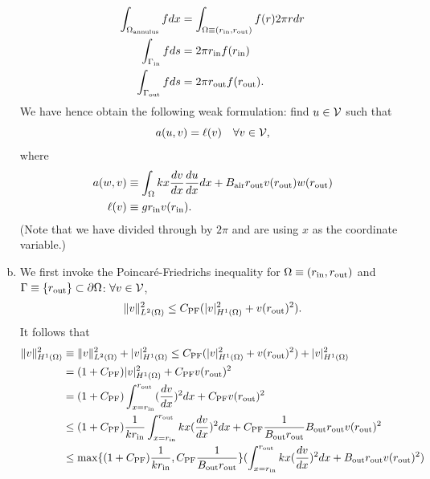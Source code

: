\documentclass[preprint,11pt]{article}
\begin{document}
\begin{enumerate}[(a)]
  \begin{align*}
    \int_{\Omega_{\rm annulus}} f dx
    &= \int_{\Omega \equiv (r_{\rm in},r_{\rm out})} f(r) 2\pi r dr \\
    \int_{\Gamma_{\rm in}} f ds
    &= 2\pi r_{\rm in} f(r_{\rm in}) \\
    \int_{\Gamma_{\rm out}} f ds
    &= 2\pi r_{\rm out} f(r_{\rm out}).
  \end{align*}
  We have hence obtain the following weak formulation: find $u \in \mathcal{V}$ such that
  \begin{equation*}
    a(u,v) = \ell(v) \quad \forall v \in \mathcal{V},
  \end{equation*}
  where
  \begin{align*}
    a(w,v) &\equiv \int_{\Omega} k x \frac{d v}{d x} \frac{d u}{d x} dx + B_{\rm air} r_{\rm out} v(r_{\rm out})w(r_{\rm out}) \\
    \ell(v) &\equiv  g r_{\rm in} v(r_{\rm in})   .
  \end{align*}
  (Note that we have divided through by $2\pi$ and are using $x$ as the coordinate variable.)
\item We first invoke the Poincar\'e-Friedrichs inequality for $\Omega \equiv (r_{\rm in}, r_{\rm out})$ and $\Gamma \equiv \{ r_{\rm out} \} \subset \partial \Omega$: $\forall v \in \mathcal{V}$,
  \begin{align*}
    \| v \|_{L^2(\Omega)}^2 \leq C_{\rm PF} (|v|^2_{H^1(\Omega)} + v(r_{\rm out})^2). 
  \end{align*}
  It follows that
  \begin{align*}
    \| v \|_{H^1(\Omega)}^2
    &\equiv
    \| v \|_{L^2(\Omega)}^2  + | v |_{H^1(\Omega)}^2
    \leq
    C_{\rm PF} (|v|^2_{H^1(\Omega)} + v(r_{\rm out})^2) + | v |_{H^1(\Omega)}^2
    \\
    &= (1 + C_{\rm PF}) | v |^2_{H^1(\Omega)} +  C_{\rm PF} v(r_{\rm out})^2
    \\
    &= (1 + C_{\rm PF}) \int_{x = r_{\rm in}}^{r_{\rm out}} (\dd{v}{x})^2 dx +  C_{\rm PF} v(r_{\rm out})^2
    \\
    &\leq
    (1 + C_{\rm PF}) \frac{1}{k r_{\rm in}} \int_{x = r_{\rm in}}^{r_{\rm out}} kx (\dd{v}{x})^2 dx +  C_{\rm PF} \frac{1}{B_{\rm out} r_{\rm out}}B_{\rm out} r_{\rm out} v(r_{\rm out})^2
    \\
    &\leq
    \max\{   (1 + C_{\rm PF}) \frac{1}{k r_{\rm in}}, C_{\rm PF} \frac{1}{B_{\rm out} r_{\rm out}} \} ( \int_{x = r_{\rm in}}^{r_{\rm out}} kx (\dd{v}{x})^2 dx + B_{\rm out} r_{\rm out} v(r_{\rm out})^2) \\

\end{align*}
\end{enumerate}
\end{document}
